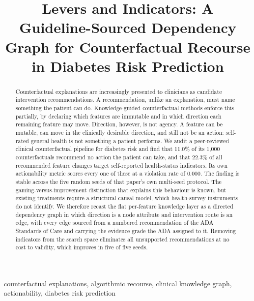 \documentclass[conference]{IEEEtran}
\begin{document}
\title{Levers and Indicators: A Guideline-Sourced Dependency Graph for Counterfactual Recourse in Diabetes Risk Prediction}

\author{
}

\maketitle

\begin{abstract}
Counterfactual explanations are increasingly presented to clinicians as candidate intervention recommendations. A recommendation, unlike an explanation, must name something the patient can do. Knowledge-guided counterfactual methods enforce this partially, by declaring which features are immutable and in which direction each remaining feature may move. Direction, however, is not agency. A feature can be mutable, can move in the clinically desirable direction, and still not be an action: self-rated general health is not something a patient performs. We audit a peer-reviewed clinical counterfactual pipeline for diabetes risk and find that 11.0\% of its 1{,}000 counterfactuals recommend no action the patient can take, and that 22.3\% of all recommended feature changes target self-reported health-status indicators. Its own actionability metric scores every one of these at a violation rate of 0.000. The finding is stable across the five random seeds of that paper's own multi-seed protocol. The gaming-versus-improvement distinction that explains this behaviour is known, but existing treatments require a structural causal model, which health-survey instruments do not identify. We therefore recast the flat per-feature knowledge layer as a directed dependency graph in which direction is a node attribute and intervention route is an edge, with every edge sourced from a numbered recommendation of the ADA Standards of Care and carrying the evidence grade the ADA assigned to it. Removing indicators from the search space eliminates all unsupported recommendations at no cost to validity, which improves in five of five seeds.
\end{abstract}

\begin{IEEEkeywords}
counterfactual explanations, algorithmic recourse, clinical knowledge graph, actionability, diabetes risk prediction
\end{IEEEkeywords}
\end{document}
